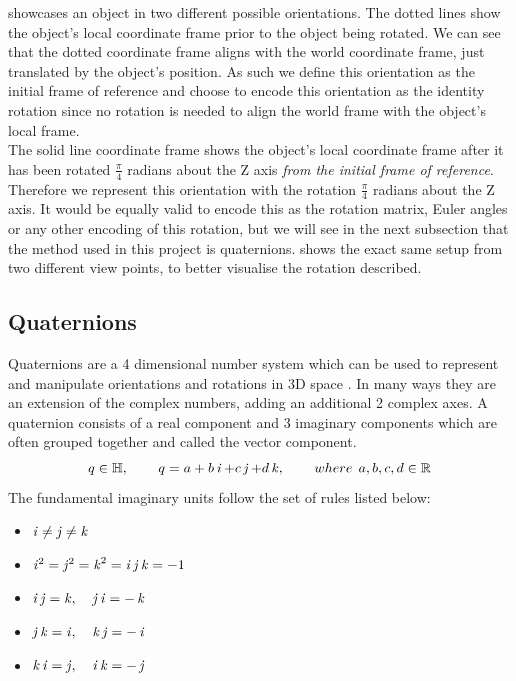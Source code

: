  showcases an object in two different possible orientations. The dotted lines show the object's local coordinate frame prior to the object being rotated. We can see that the dotted coordinate frame aligns with the world coordinate frame, just translated by the object's position. As such we define this orientation as the initial frame of reference and choose to encode this orientation as the identity rotation since no rotation is needed to align the world frame with the object's local frame.\\

The solid line coordinate frame shows the object's local coordinate frame after it has been rotated $\frac{\pi}{4}$ radians about the Z axis \textit{from the initial frame of reference}. Therefore we represent this orientation with the rotation $\frac{\pi}{4}$ radians about the Z axis. It would be equally valid to encode this as the rotation matrix, Euler angles or any other encoding of this rotation, but we will see in the next subsection that the method used in this project is quaternions.  shows the exact same setup from two different view points, to better visualise the rotation described.

\subsection{Quaternions}
\label{subsec:quaternions}
Quaternions are a 4 dimensional number system \cite{quaternions} which can be used to represent and manipulate orientations and rotations in 3D space \cite{orientations}. In many ways they are an extension of the complex numbers, adding an additional 2 complex axes. A quaternion consists of a real component and 3 imaginary components which are often grouped together and called the vector component.
$$q \in \operatorname{\mathbb{H}}, \operatorname{\operatorname{\: \: \: \:} \operatorname{\: \: \: \:}} q = a + b\operatorname{\mathit{i}} + c\operatorname{\mathit{j}} + d\operatorname{\mathit{k}}, \operatorname{\operatorname{\: \: \: \:} \operatorname{\: \: \: \:}} where \: \: a,b,c,d \in \operatorname{\mathbb{R}}$$
The fundamental imaginary units follow the set of rules listed below:
\begin{itemize}
    \item $\operatorname{\mathit{i}} \neq \operatorname{\mathit{j}} \neq \operatorname{\mathit{k}}$
    \item $\operatorname{\mathit{i}}^2 = \operatorname{\mathit{j}}^2 = \operatorname{\mathit{k}}^2 = \operatorname{\mathit{i}}\operatorname{\mathit{j}}\operatorname{\mathit{k}} = -1$
    \item $\operatorname{\mathit{i}}\operatorname{\mathit{j}} = \operatorname{\mathit{k}}, \operatorname{\: \: \: \:} \operatorname{\mathit{j}}\operatorname{\mathit{i}} = -\operatorname{\mathit{k}}$
    \item $\operatorname{\mathit{j}}\operatorname{\mathit{k}} = \operatorname{\mathit{i}}, \operatorname{\: \: \: \:} \operatorname{\mathit{k}}\operatorname{\mathit{j}} = -\operatorname{\mathit{i}}$
    \item $\operatorname{\mathit{k}}\operatorname{\mathit{i}} = \operatorname{\mathit{j}}, \operatorname{\: \: \: \:} \operatorname{\mathit{i}}\operatorname{\mathit{k}} = -\operatorname{\mathit{j}}$
\end{itemize}

